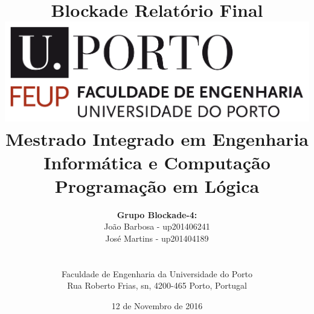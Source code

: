 \documentclass[a4paper]{article}
\begin{document}
\nocite{*}

\setlength{\textwidth}{16cm}
\setlength{\textheight}{22cm}

\title{\Huge\textbf{Blockade}\linebreak\linebreak\linebreak
\Large\textbf{Relatório Final}\linebreak\linebreak
\linebreak\linebreak
\includegraphics[scale=0.1]{feup-logo.png}\linebreak\linebreak
\linebreak\linebreak
\Large{Mestrado Integrado em Engenharia Informática e Computação} \linebreak\linebreak
\Large{Programação em Lógica}\linebreak
}

\author{\textbf{Grupo Blockade-4:}\\  João Barbosa - up201406241 \\ José Martins - up201404189 \\\linebreak\linebreak \\
 \\ Faculdade de Engenharia da Universidade do Porto \\ Rua Roberto Frias, s\/n, 4200-465 Porto, Portugal 
\vspace{1cm}}
\date{12 de Novembro de 2016}
\maketitle
\thispagestyle{empty}

\end{document}
